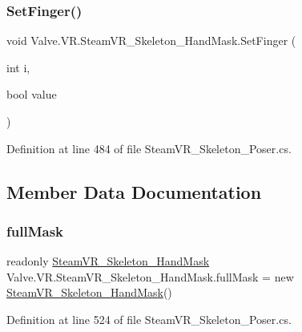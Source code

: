 \subsubsection{\texorpdfstring{SetFinger()}{SetFinger()}}
{\footnotesize\ttfamily void Valve.\+V\+R.\+Steam\+V\+R\+\_\+\+Skeleton\+\_\+\+Hand\+Mask.\+Set\+Finger (\begin{DoxyParamCaption}\item[{int}]{i,  }\item[{bool}]{value }\end{DoxyParamCaption})}



Definition at line 484 of file Steam\+V\+R\+\_\+\+Skeleton\+\_\+\+Poser.\+cs.



\subsection{Member Data Documentation}
\mbox{\label{class_valve_1_1_v_r_1_1_steam_v_r___skeleton___hand_mask_ae704ddd65cd4b256f45fbf64de99be96}} 
\subsubsection{\texorpdfstring{fullMask}{fullMask}}
{\footnotesize\ttfamily readonly \mbox{\hyperlink{class_valve_1_1_v_r_1_1_steam_v_r___skeleton___hand_mask}{Steam\+V\+R\+\_\+\+Skeleton\+\_\+\+Hand\+Mask}} Valve.\+V\+R.\+Steam\+V\+R\+\_\+\+Skeleton\+\_\+\+Hand\+Mask.\+full\+Mask = new \mbox{\hyperlink{class_valve_1_1_v_r_1_1_steam_v_r___skeleton___hand_mask}{Steam\+V\+R\+\_\+\+Skeleton\+\_\+\+Hand\+Mask}}()\hspace{0.3cm}{\ttfamily [static]}}



Definition at line 524 of file Steam\+V\+R\+\_\+\+Skeleton\+\_\+\+Poser.\+cs.

\mbox{\label{class_valve_1_1_v_r_1_1_steam_v_r___skeleton___hand_mask_ad0f8344c5d0ee046db536ce55b8b2ca5}} 
